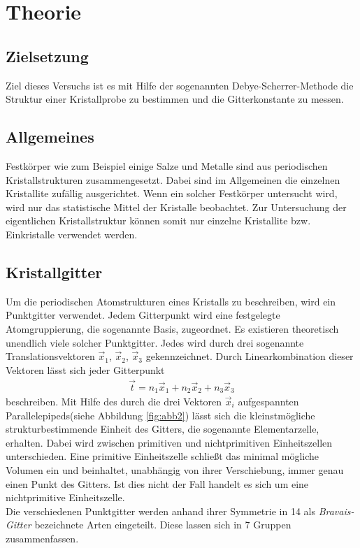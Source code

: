 \section{Theorie}
\label{sec:Theorie}

\subsection{Zielsetzung}
\label{subsec:Zielsetzung}
Ziel dieses Versuchs ist es mit Hilfe der sogenannten
Debye-Scherrer-Methode die Struktur einer Kristallprobe
zu bestimmen und die Gitterkonstante zu messen.

\subsection{Allgemeines}
\label{subsec:allgemein}

Festkörper wie zum Beispiel einige Salze und Metalle
sind aus periodischen
Kristallstrukturen zusammengesetzt. Dabei sind im
Allgemeinen die einzelnen Kristallite zufällig
ausgerichtet. Wenn ein solcher Festkörper untersucht wird,
wird nur das statistische Mittel der Kristalle beobachtet.
Zur Untersuchung der eigentlichen Kristallstruktur
können somit nur einzelne Kristallite bzw.
Einkristalle verwendet werden.

\subsection{Kristallgitter}
\label{subsec:kristallstrukturen}
Um die periodischen Atomstrukturen eines Kristalls
zu beschreiben, wird ein Punktgitter verwendet.
Jedem Gitterpunkt wird eine festgelegte Atomgruppierung,
die sogenannte Basis, zugeordnet.
Es existieren theoretisch unendlich viele solcher Punktgitter.
Jedes wird durch drei sogenannte Translationsvektoren
$\vec{x}_{1}$, $\vec{x}_{2}$, $\vec{x}_{3}$ gekennzeichnet.
Durch Linearkombination dieser Vektoren lässt sich
jeder Gitterpunkt
\begin{align}
\label{eqn:1*}
\vec{t} = n_{1} \vec{x}_{1} + n_{2} \vec{x}_{2} + n_{3} \vec{x}_{3}
\end{align}
beschreiben.
Mit Hilfe des durch die drei Vektoren $\vec{x}_{i}$ aufgespannten
Parallelepipeds(siehe Abbildung \ref{fig:abb2}) lässt sich die
kleinstmögliche strukturbestimmende Einheit des Gitters,
die sogenannte Elementarzelle, erhalten.
Dabei wird zwischen primitiven und nichtprimitiven Einheitszellen
unterschieden. Eine primitive Einheitszelle schließt das minimal mögliche Volumen ein
und beinhaltet, unabhängig von ihrer Verschiebung, immer genau einen Punkt des
Gitters. Ist dies nicht der Fall handelt es sich um eine nichtprimitive Einheitszelle.\\
Die verschiedenen Punktgitter werden anhand ihrer Symmetrie
in 14 als \textit{Bravais-Gitter} bezeichnete Arten eingeteilt.
Diese lassen sich in 7 Gruppen zusammenfassen.

